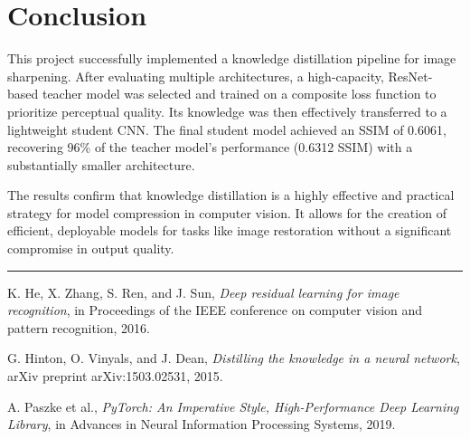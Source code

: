 \documentclass[12pt,a4paper]{article}
\begin{document}
\newpage
\section{Conclusion}
This project successfully implemented a knowledge distillation pipeline for image sharpening. After evaluating multiple architectures, a high-capacity, ResNet-based teacher model was selected and trained on a composite loss function to prioritize perceptual quality. Its knowledge was then effectively transferred to a lightweight student CNN. The final student model achieved an SSIM of 0.6061, recovering 96\% of the teacher model's performance (0.6312 SSIM) with a substantially smaller architecture.

The results confirm that knowledge distillation is a highly effective and practical strategy for model compression in computer vision. It allows for the creation of efficient, deployable models for tasks like image restoration without a significant compromise in output quality.

\newpage
\hrule
\vspace{0.5cm}
\begin{thebibliography}{9}
    K. He, X. Zhang, S. Ren, and J. Sun,
    \textit{Deep residual learning for image recognition},
    in Proceedings of the IEEE conference on computer vision and pattern recognition, 2016.
    
    G. Hinton, O. Vinyals, and J. Dean,
    \textit{Distilling the knowledge in a neural network},
    arXiv preprint arXiv:1503.02531, 2015.

    A. Paszke et al.,
    \textit{PyTorch: An Imperative Style, High-Performance Deep Learning Library},
    in Advances in Neural Information Processing Systems, 2019.

\end{thebibliography}
\end{document}
